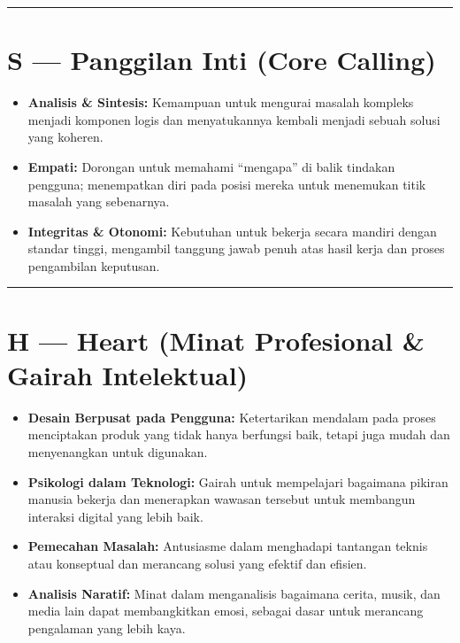\documentclass[
  letterpaper,
  DIV=11,
  numbers=noendperiod]{scrreprt}
\providecommand{\tightlist}{%
  \setlength{\itemsep}{0pt}\setlength{\parskip}{0pt}}
\begin{document}
\begin{center}\rule{0.5\linewidth}{0.5pt}\end{center}

\section{S --- Panggilan Inti (Core
Calling)}\label{s-panggilan-inti-core-calling}

\begin{itemize}
\tightlist
\item
  \textbf{Analisis \& Sintesis:} Kemampuan untuk mengurai masalah
  kompleks menjadi komponen logis dan menyatukannya kembali menjadi
  sebuah solusi yang koheren.
\item
  \textbf{Empati:} Dorongan untuk memahami ``mengapa'' di balik tindakan
  pengguna; menempatkan diri pada posisi mereka untuk menemukan titik
  masalah yang sebenarnya.
\item
  \textbf{Integritas \& Otonomi:} Kebutuhan untuk bekerja secara mandiri
  dengan standar tinggi, mengambil tanggung jawab penuh atas hasil kerja
  dan proses pengambilan keputusan.
\end{itemize}

\begin{center}\rule{0.5\linewidth}{0.5pt}\end{center}

\section{H --- Heart (Minat Profesional \& Gairah
Intelektual)}\label{h-heart-minat-profesional-gairah-intelektual}

\begin{itemize}
\tightlist
\item
  \textbf{Desain Berpusat pada Pengguna:} Ketertarikan mendalam pada
  proses menciptakan produk yang tidak hanya berfungsi baik, tetapi juga
  mudah dan menyenangkan untuk digunakan.
\item
  \textbf{Psikologi dalam Teknologi:} Gairah untuk mempelajari bagaimana
  pikiran manusia bekerja dan menerapkan wawasan tersebut untuk
  membangun interaksi digital yang lebih baik.
\item
  \textbf{Pemecahan Masalah:} Antusiasme dalam menghadapi tantangan
  teknis atau konseptual dan merancang solusi yang efektif dan efisien.
\item
  \textbf{Analisis Naratif:} Minat dalam menganalisis bagaimana cerita,
  musik, dan media lain dapat membangkitkan emosi, sebagai dasar untuk
  merancang pengalaman yang lebih kaya.
\end{itemize}
\end{document}
